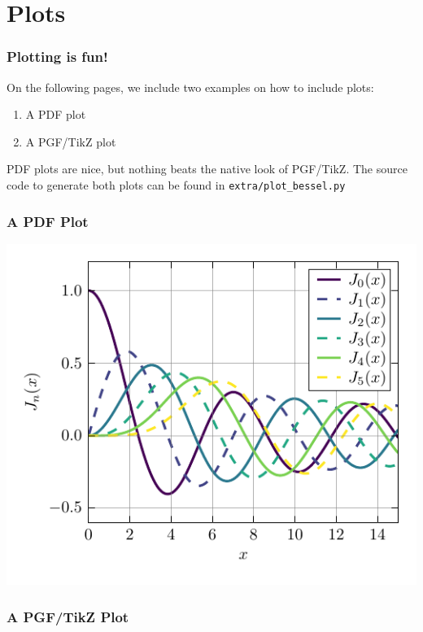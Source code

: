 \documentclass[pdf, mathserif]{beamer}
\begin{document}
\section{Plots}
\label{sec:plots}

\begin{frame}
  \frametitle{Plotting is fun!}

  On the following pages, we include two examples on how to include plots:
  \begin{enumerate}
    \item A PDF plot
    \item A PGF/TikZ plot
  \end{enumerate}

  PDF plots are nice, but nothing beats the native look of PGF/TikZ. The source
  code to generate both plots can be found in \texttt{extra/plot\_bessel.py}
\end{frame}

\begin{frame}
  \frametitle{A PDF Plot}
  \begin{center}
    \includegraphics{./plots/bessel.pdf}
  \end{center}
\end{frame}

\begin{frame}
  \frametitle{A PGF/TikZ Plot}
  \begin{center}
    
  \end{center}
\end{frame}
\end{document}
